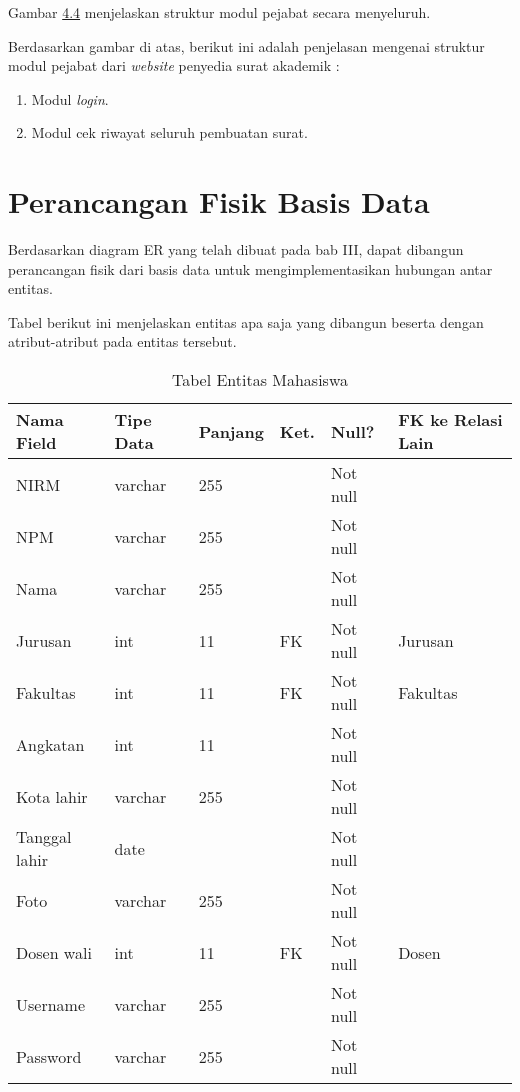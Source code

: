 Gambar \hyperlink{struktur_modul_pejabat}{4.4} menjelaskan struktur modul pejabat secara menyeluruh.


Berdasarkan gambar di atas, berikut ini adalah penjelasan mengenai struktur modul pejabat dari \textit{\textit{website}} penyedia surat akademik :
\begin{enumerate}
	\item Modul \textit{login}.
	\item Modul cek riwayat seluruh pembuatan surat.
\end{enumerate}

\section{Perancangan Fisik Basis Data}
\label{sec:perancangan_fisik_basis_data}
Berdasarkan diagram ER yang telah dibuat pada bab III, dapat dibangun perancangan fisik dari basis data untuk mengimplementasikan hubungan antar entitas.\

Tabel berikut ini menjelaskan entitas apa saja yang dibangun beserta dengan atribut-atribut pada entitas tersebut.

\begin{table}[H]
\centering
\caption{Tabel Entitas Mahasiswa}
\label{entitas_mahasiswa}
\begin{tabular}{|l|l|l|l|l|l|}
\hline
\textbf{Nama Field}&\textbf{Tipe Data}&\textbf{Panjang}&\textbf{Ket.}&\textbf{Null?}&\textbf{FK ke Relasi Lain}\\ \hline
NIRM&varchar&255&&Not null&\\ \hline
NPM&varchar&255&&Not null&\\ \hline
Nama&varchar&255&&Not null&\\ \hline
Jurusan&int&11&FK&Not null&Jurusan\\ \hline
Fakultas&int&11&FK&Not null&Fakultas\\ \hline
Angkatan&int&11&&Not null&\\ \hline
Kota lahir&varchar&255&&Not null&\\ \hline
Tanggal lahir&date&&&Not null&\\ \hline
Foto&varchar&255&&Not null&\\ \hline
Dosen wali&int&11&FK&Not null&Dosen\\ \hline
Username&varchar&255&&Not null&\\ \hline
Password&varchar&255&&Not null&\\ \hline
\end{tabular}
\end{table}

